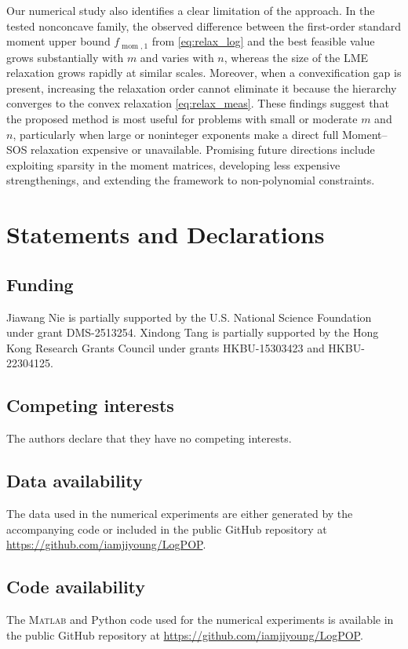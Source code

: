 \documentclass[pdflatex,sn-mathphys-num]{sn-jnl}%
\newcommand{\rd}[1]{{\color{red}#1}}
\theoremstyle{thmstyleone}%
\theoremstyle{thmstyletwo}%
\theoremstyle{thmstylethree}%
\begin{document}
\rd{Our numerical study also identifies a clear limitation of the
approach. In the tested nonconcave family, the observed difference
between the first-order standard moment upper bound
$f_{\operatorname{mom},1}$ from \eqref{eq:relax_log} and the best
feasible value
grows substantially with $m$ and varies with $n$,
whereas the size of the LME relaxation grows rapidly at similar
scales. Moreover, when a convexification gap is present,
increasing the relaxation order cannot eliminate it because the
hierarchy converges to the convex relaxation
\eqref{eq:relax_meas}.}
\rd{These findings suggest that the proposed method is most useful for
problems with small or moderate $m$ and $n$, particularly when large
or noninteger exponents make a direct full Moment--SOS relaxation
expensive or unavailable. Promising future directions include
exploiting sparsity in the moment matrices, developing less expensive
strengthenings, and extending the framework to non-polynomial
constraints.}


\section*{Statements and Declarations}

\subsection*{Funding}
\rd{Jiawang Nie is partially supported by the U.S. National Science
Foundation under grant DMS-2513254. Xindong Tang is partially supported
by the Hong Kong Research Grants Council under grants HKBU-15303423 and
HKBU-22304125.}

\subsection*{Competing interests}
\rd{The authors declare that they have no competing interests.}

\subsection*{Data availability}
\rd{The data used in the numerical experiments are either generated
by the accompanying code or included in the public GitHub repository at
\url{https://github.com/iamjiyoung/LogPOP}.}

\subsection*{Code availability}
\rd{The \textsc{Matlab} and Python code used for the numerical
experiments is available in the public GitHub repository at
\url{https://github.com/iamjiyoung/LogPOP}.}
\end{document}
